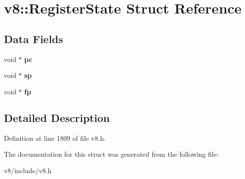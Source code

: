 \hypertarget{structv8_1_1RegisterState}{}\section{v8\+:\+:Register\+State Struct Reference}
\label{structv8_1_1RegisterState}
\subsection*{Data Fields}
\begin{DoxyCompactItemize}
\item 
\mbox{\label{structv8_1_1RegisterState_aa0d0327871d9f95d5e64f47b7f183907}} 
void $\ast$ {\bfseries pc}
\item 
\mbox{\label{structv8_1_1RegisterState_a867bb9d0b9e81c3f7256aa81dc0daee4}} 
void $\ast$ {\bfseries sp}
\item 
\mbox{\label{structv8_1_1RegisterState_aaeb80a1d7f6df3ae418f3e9b1295d156}} 
void $\ast$ {\bfseries fp}
\end{DoxyCompactItemize}


\subsection{Detailed Description}


Definition at line 1809 of file v8.\+h.



The documentation for this struct was generated from the following file\+:\begin{DoxyCompactItemize}
\item 
v8/include/v8.\+h\end{DoxyCompactItemize}
